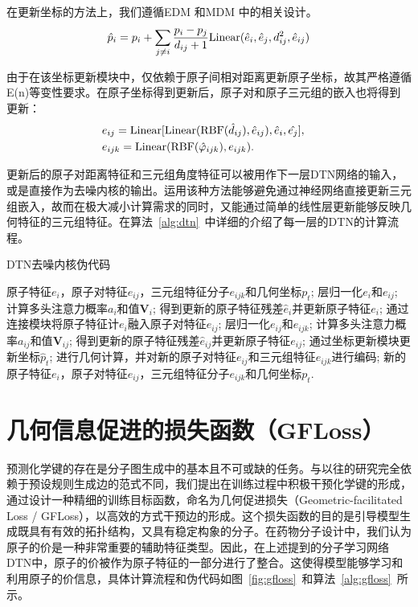 在更新坐标的方法上，我们遵循EDM \cite{edm_hoogeboom_22}和MDM \cite{mdm_huang_23}中的相关设计。
\begin{equation}
    \hat{p}_i = p_i + \sum_{j \neq i} \frac{p_i - p_j}{d_{ij} + 1} {\rm Linear}(\hat{e}_i, \hat{e}_j, d_{ij}^2, \hat{e}_{ij})
\end{equation}

由于在该坐标更新模块中，仅依赖于原子间相对距离更新原子坐标，故其严格遵循E(n)等变性要求。在原子坐标得到更新后，原子对和原子三元组的嵌入也将得到更新：
\begin{eqnarray}
  &e_{ij} = {\rm Linear}[{\rm Linear}({\rm RBF}(\hat{d}_{ij}), \hat{e}_{ij}), \hat{e}_i, \hat{e_j}],& \\
  &e_{ijk} = {\rm Linear}({\rm RBF}(\hat{\varphi}_{ijk}), e_{ijk}). &
\end{eqnarray}

更新后的原子对距离特征和三元组角度特征可以被用作下一层DTN网络的输入，或是直接作为去噪内核的输出。运用该种方法能够避免通过神经网络直接更新三元组嵌入，故而在极大减小计算需求的同时，又能通过简单的线性层更新能够反映几何特征的三元组特征。在算法~\ref{alg:dtn}~中详细的介绍了每一层的DTN的计算流程。

\begin{algorithm}[H]
    \caption{DTN去噪内核伪代码}
    \label{alg:dtn}
    \begin{algorithmic}
     原子特征$e_i$，原子对特征$e_{ij}$，三元组特征分子$e_{ijk}$和几何坐标$p_t$;
    \STATE 层归一化$e_i$和$e_{ij}$;
    \STATE 计算多头注意力概率$a_i$和值$\mathbf{V}_i$;
    \STATE 得到更新的原子特征残差$\hat{e}_i$并更新原子特征$e_i$;
    \STATE 通过连接模块将原子特征计$e_i$融入原子对特征$e_{ij}$;
    \STATE 层归一化$e_{ij}$和$e_{ijk}$;
    \STATE 计算多头注意力概率$a_{ij}$和值$\mathbf{V}_{ij}$;
    \STATE 得到更新的原子特征残差$\hat{e}_{ij}$并更新原子特征$e_{ij}$;
    \STATE 通过坐标更新模块更新坐标$\hat{p}_t$;
    \STATE 进行几何计算，并对新的原子对特征$e_{ij}$和三元组特征$e_{ijk}$进行编码;
     新的原子特征$e_i$，原子对特征$e_{ij}$，三元组特征分子$e_{ijk}$和几何坐标$p_t$.
    \end{algorithmic}
\end{algorithm}

\section{几何信息促进的损失函数（GFLoss）}
预测化学键的存在是分子图生成中的基本且不可或缺的任务。与以往的研究完全依赖于预设规则生成边的范式不同，我们提出在训练过程中积极干预化学键的形成，通过设计一种精细的训练目标函数，命名为几何促进损失（Geometric-facilitated Loss / GFLoss），以高效的方式干预边的形成。这个损失函数的目的是引导模型生成既具有有效的拓扑结构，又具有稳定构象的分子。在药物分子设计中，我们认为原子的价是一种非常重要的辅助特征类型。因此，在上述提到的分子学习网络DTN中，原子的价被作为原子特征的一部分进行了整合。这使得模型能够学习和利用原子的价信息，具体计算流程和伪代码如图~\ref{fig:gfloss}~和算法~\ref{alg:gfloss}~所示。

